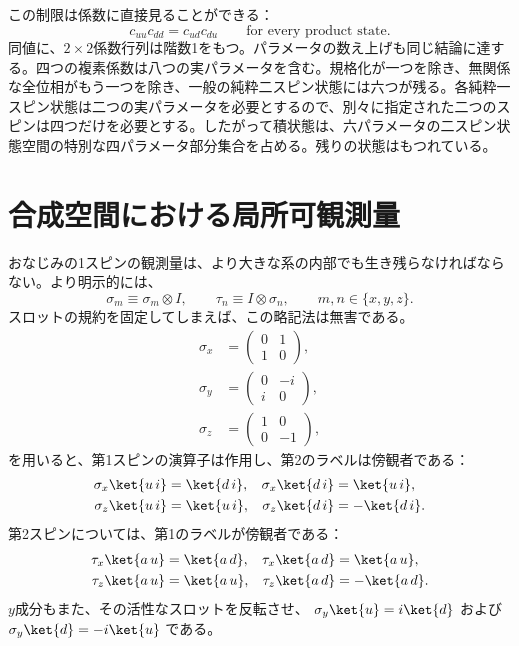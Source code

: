 この制限は係数に直接見ることができる：
\begin{equation}
c_{uu}c_{dd}=c_{ud}c_{du}
\qquad\text{for every product state}.
\label{eq:l6-rank-one-condition}
\end{equation}
同値に、\(2\times2\)係数行列は階数1をもつ。パラメータの数え上げも同じ結論に達する。四つの複素係数は八つの実パラメータを含む。規格化が一つを除き、無関係な全位相がもう一つを除き、一般の純粋二スピン状態には六つが残る。各純粋一スピン状態は二つの実パラメータを必要とするので、別々に指定された二つのスピンは四つだけを必要とする。したがって積状態は、六パラメータの二スピン状態空間の特別な四パラメータ部分集合を占める。残りの状態はもつれている。

\section{合成空間における局所可観測量}

おなじみの1スピンの観測量は、より大きな系の内部でも生き残らなければならない。より明示的には、
\begin{equation}
\sigma_m\equiv\sigma_m\otimes I,
\qquad
\tau_n\equiv I\otimes\sigma_n,
\qquad
m,n\in\{x,y,z\}.
\label{eq:l6-local-operators}
\end{equation}
スロットの規約を固定してしまえば、この略記法は無害である。
\begin{equation}
\begin{aligned}
\sigma_x&=
\begin{pmatrix}0&1\\1&0\end{pmatrix},\\[0.4em]
\sigma_y&=
\begin{pmatrix}0&-i\\i&0\end{pmatrix},\\[0.4em]
\sigma_z&=
\begin{pmatrix}1&0\\0&-1\end{pmatrix},
\end{aligned}
\end{equation}
を用いると、第1スピンの演算子は作用し、第2のラベルは傍観者である：
\begin{align}
\sigma_x\ket{u\,i}&=\ket{d\,i},
&
\sigma_x\ket{d\,i}&=\ket{u\,i},\\
\sigma_z\ket{u\,i}&=\ket{u\,i},
&
\sigma_z\ket{d\,i}&=-\ket{d\,i}.
\end{align}
第2スピンについては、第1のラベルが傍観者である：
\begin{align}
\tau_x\ket{a\,u}&=\ket{a\,d},
&
\tau_x\ket{a\,d}&=\ket{a\,u},\\
\tau_z\ket{a\,u}&=\ket{a\,u},
&
\tau_z\ket{a\,d}&=-\ket{a\,d}.
\label{eq:l6-spectator-action}
\end{align}
\(y\)成分もまた、その活性なスロットを反転させ、
\(\sigma_y\ket{u}=i\ket{d}\) および
\(\sigma_y\ket{d}=-i\ket{u}\) である。

